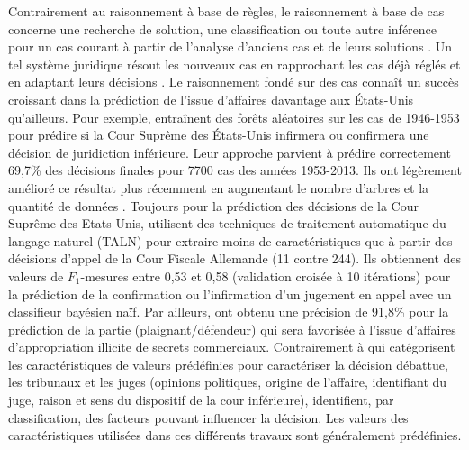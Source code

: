 Contrairement au raisonnement à base de règles, le raisonnement à base de cas concerne une recherche de solution, une classification ou toute autre inférence pour un cas courant à partir de l'analyse d'anciens cas et de leurs solutions \citep{moens2002case-basedreasoning}. Un tel système juridique résout les nouveaux cas en rapprochant les cas déjà réglés et en adaptant leurs décisions \citep{Berka2011rbr-cbr}. Le raisonnement fondé sur des cas connaît un succès croissant dans la prédiction de l'issue d'affaires davantage aux États-Unis qu'ailleurs. Pour exemple, \citet{katz2014predicting} entraînent des forêts aléatoires \citep{breiman2001randomforest} sur les cas de 1946-1953 pour prédire si la Cour Suprême des États-Unis infirmera ou confirmera une décision de juridiction inférieure. Leur approche parvient à prédire correctement 69,7\% des décisions finales pour 7700 cas des années 1953-2013. Ils ont légèrement amélioré ce résultat plus récemment en augmentant le nombre d'arbres et la quantité de données \citep{katz2017predictsupremecourt}. Toujours pour la prédiction des décisions de la Cour Suprême des Etats-Unis, \citet{waltl2017predictgermantaxlaw} utilisent des techniques de traitement automatique du langage naturel (TALN) pour extraire moins de caractéristiques que \citep{katz2014predicting}  à partir des décisions d'appel de la Cour Fiscale Allemande (11 contre 244). Ils obtiennent des valeurs de $F_1$-mesures entre 0,53 et 0,58 (validation croisée à 10 itérations) pour la prédiction  de la confirmation ou l'infirmation d'un jugement en appel avec un classifieur bayésien naïf.  Par ailleurs, \cite{Ashley2009classifCases} ont obtenu une précision de 91,8\% pour la prédiction de la partie (plaignant/défendeur)  qui sera favorisée à l'issue d'affaires d'appropriation illicite de secrets commerciaux. Contrairement à \citep{katz2014predicting} qui catégorisent les caractéristiques de valeurs prédéfinies pour caractériser la décision débattue, les tribunaux et les juges (opinions politiques, origine de l'affaire, identifiant du juge, raison et sens du dispositif de la cour inférieure), \cite{Ashley2009classifCases} identifient, par classification, des facteurs pouvant influencer la décision. Les valeurs des caractéristiques utilisées dans ces différents travaux sont généralement prédéfinies.%

